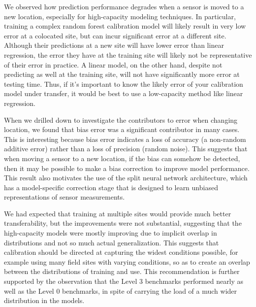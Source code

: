 \documentclass[journal abbreviation, manuscript]{copernicus}
\newcommand{\textus}[1]{$_{\text{#1}}$}
\begin{document}
We observed how prediction performance degrades when a sensor is moved to a new location, especially for high-capacity modeling techniques. In particular, training a complex random forest calibration model will likely result in very low error at a colocated site, but can incur significant error at a different site. Although their predictions at a new site will have lower error than linear regression, the error they have at the training site will likely not be representative of their error in practice.  A linear model, on the other hand, despite not predicting as well at the training site, will not have significantly more error at testing time.  Thus, if it's important to know the likely error of your calibration model under transfer, it would be best to use a low-capacity method like linear regression.

When we drilled down to investigate the contributors to error when changing location, we found that bias error was a significant contributor in many cases. This is interesting because bias error indicates a loss of accuracy (a non-random additive error) rather than a loss of precision (random noise). This suggests that when moving a sensor to a new location, if the bias can somehow be detected, then it may be possible to make a bias correction to improve model performance. This result also motivates the use of the split neural network architecture, which has a model-specific correction stage that is designed to learn unbiased representations of sensor measurements.

We had expected that training at multiple sites would provide much better transferability, but the improvements were not substantial, suggesting that the high-capacity models were mostly improving due to implicit overlap in distributions and not so much actual generalization.  This suggests that calibration should be directed at capturing the widest conditions possible, for example using many field sites with varying conditions, so as to create an overlap between the distributions of training and use.  This recommendation is further supported by the observation that the Level 3 benchmarks performed nearly as well as the Level 0 benchmarks, in spite of carrying the load of a much wider distribution in the models.
\end{document}
